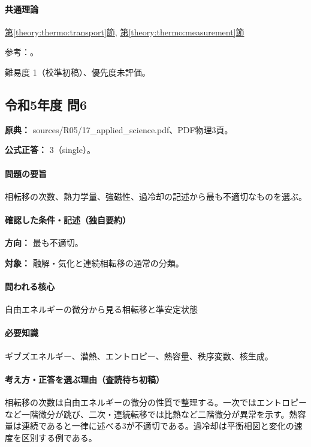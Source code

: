 \paragraph{共通理論} \hyperref[theory:thermo:transport]{第\ref*{theory:thermo:transport}節}, \hyperref[theory:thermo:measurement]{第\ref*{theory:thermo:measurement}節}

\par 参考：\cite{aist_metal_thermal,wang_sun_diamond2024}。

\par 難易度 1（校準初稿）、優先度未評価。

\subsection{令和5年度 問6}
\label{q:r05-reg-applied-06}

\noindent\textbf{原典：} sources/R05/17\_applied\_science.pdf、PDF物理3頁。

\textbf{公式正答：} 3（single）。

\paragraph{問題の要旨} 相転移の次数、熱力学量、強磁性、過冷却の記述から最も不適切なものを選ぶ。

\paragraph{確認した条件・記述（独自要約）}\mbox{}\par

\noindent\textbf{方向：} 最も不適切。\par

\noindent\textbf{対象：} 融解・気化と連続相転移の通常の分類。\par

\paragraph{問われる核心} 自由エネルギーの微分から見る相転移と準安定状態

\paragraph{必要知識} ギブズエネルギー、潜熱、エントロピー、熱容量、秩序変数、核生成。

\paragraph{考え方・正答を選ぶ理由（査読待ち初稿）} 相転移の次数は自由エネルギーの微分の性質で整理する。一次ではエントロピーなど一階微分が跳び、二次・連続転移では比熱など二階微分が異常を示す。熱容量は連続であると一律に述べる3が不適切である。過冷却は平衡相図と変化の速度を区別する例である。

